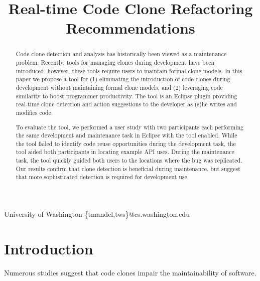 \documentclass[nocopyrightspace,10pt]{sigplanconf}
\begin{document}
%

\title{Real-time Code Clone Refactoring Recommendations}
           {University of Washington}
           {\{tmandel,tws\}@cs.washington.edu}

\maketitle
\begin{abstract}
Code clone detection and analysis has historically been viewed as a
maintenance problem. Recently, tools for managing clones during
development have been introduced, however, these tools require
users to maintain formal clone models.
In this paper we propose a tool for (1) eliminating the
introduction of code clones during development without maintaining formal clone models, and (2) leveraging code
similarity to boost programmer productivity.
The tool
is an Eclipse plugin providing real-time clone detection and action
suggestions to the developer as (s)he writes and modifies
code. 

To evaluate the tool, we performed a user study with two participants
each performing the same development and maintenance task in Eclipse
with the tool enabled.  While the tool failed to identify code reuse
opportunities during the development task, the tool aided both
participants in locating example API uses. During the maintenance
task, the tool quickly guided both users to the locations where the
bug was replicated. Our results confirm that clone detection is
beneficial during maintenance, but suggest that more sophisticated
detection is required for development use.

\end{abstract}



\section{Introduction}
\label{sec:intro}
Numerous studies suggest that code clones impair the maintainability
of software.
\end{document}
